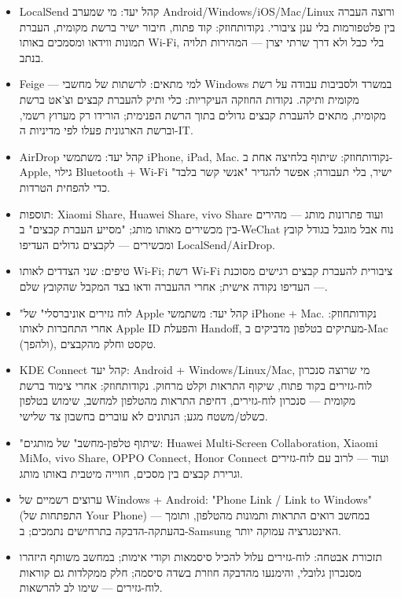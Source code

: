 
\begin{itemize}
  \item LocalSend קהל יעד: מי שמערב Android/Windows/iOS/Mac/Linux ורוצה העברה בין פלטפורמות בלי ענן ציבורי. נקודותחוזק: קוד פתוח, חיבור ישיר ברשת מקומית, העברת תמונות ווידאו ומסמכים באותו Wi-Fi, בלי כבל ולא דרך שרתי יצרן — המהירות תלויה בנתב.
  \item Feige — למי מתאים: לרשתות של מחשבי Windows במשרד ולסביבות עבודה על רשת מקומית ותיקה. נקודות החוזקה העיקריות: כלי ותיק להעברת קבצים וצ'אט ברשת מקומית, מתאים להעברת קבצים גדולים בתוך הרשת הפנימית; הורידו רק מערוץ רשמי, וברשת הארגונית פעלו לפי מדיניות ה-IT.
  \item AirDrop קהל יעד: משתמשי iPhone, iPad, Mac. נקודותחוזק: שיתוף בלחיצה אחת ב-Apple, גילוי Bluetooth + Wi-Fi ישיר, בלי תעבורה; אפשר להגדיר "אנשי קשר בלבד" כדי להפחית הטרדות.
  \item תוספות: Xiaomi Share, Huawei Share, vivo Share ועוד פתרונות מותג — מהירים בין מכשירים מאותו מותג; "מסייע העברת קבצים" ב-WeChat נוח אבל מוגבל בגודל קובץ ומכשירים — לקבצים גדולים העדיפו LocalSend/AirDrop.
  \item טיפים: שני הצדדים לאותו Wi-Fi; רשת Wi-Fi ציבורית להעברת קבצים רגישים מסוכנת — העדיפו נקודה אישית; אחרי ההעברה ודאו בצד המקבל שהקובץ שלם.
\end{itemize}


\begin{itemize}
  \item "לוח גזירים אוניברסלי" של Apple קהל יעד: משתמשי iPhone + Mac. נקודותחוזק: אחרי התחברות לאותו Apple ID והפעלת Handoff, מעתיקים בטלפון מדביקים ב-Mac (ולהפך), טקסט וחלק מהקבצים.
  \item KDE Connect קהל יעד: Android + Windows/Linux/Mac, מי שרוצה סנכרון לוח-גזירים בקוד פתוח, שיקוף התראות וקלט מרחוק. נקודותחוזק: אחרי צימוד ברשת מקומית — סנכרון לוח-גזירים, דחיפת התראות מהטלפון למחשב, שימוש בטלפון כשלט/משטח מגע; הנתונים לא עוברים בחשבון צד שלישי.
  \item "שיתוף טלפון-מחשב" של מותגים: Huawei Multi-Screen Collaboration, Xiaomi MiMo, vivo Share, OPPO Connect, Honor Connect ועוד — לרוב עם לוח-גזירים וגרירת קבצים בין מסכים, חווייה מיטבית באותו מותג.
  \item ערוצים רשמיים של Windows + Android: "Phone Link / Link to Windows" (התפתחות של Your Phone) — במחשב רואים התראות ותמונות מהטלפון, ותומך בהעתקה-הדבקה בתרחישים נתמכים; ב-Samsung האינטגרציה עמוקה יותר.
  \item תזכורת אבטחה: לוח-גזירים עלול להכיל סיסמאות וקודי אימות; במחשב משותף היזהרו מסנכרון גלובלי, והימנעו מהדבקה חוזרת בשדה סיסמה; חלק ממקלדות גם קוראות לוח-גזירים — שימו לב להרשאות.
\end{itemize}

